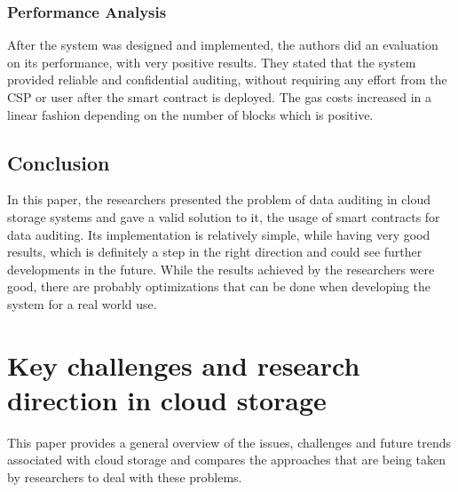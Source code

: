 \documentclass[14pt,oneside]{extreport}
\newcommand*\fpar{\hspace{1ex}}
\begin{document}
\subsection{Performance Analysis}
After the system was designed and implemented, the authors did an evaluation on its performance, with very positive results. They stated that the system provided reliable and confidential auditing, without requiring any effort from the CSP or user after the smart contract is deployed. The gas costs increased in a linear fashion depending on the number of blocks which is positive.
\section{Conclusion}
In this paper, the researchers presented the problem of data auditing in cloud storage systems and gave a valid solution to it, the usage of smart contracts for data auditing. Its implementation is relatively simple, while having very good results, which is definitely a step in the right direction and could see further developments in the future. While the results achieved by the researchers were good, there are probably optimizations that can be done when developing the system for a real world use.

\chapter{\Large{Key challenges and research direction in cloud storage \cite{paper5}}}
\vspace{-2em}
\fpar This paper provides a general overview of the issues, challenges and future trends associated with cloud storage and compares the approaches that are being taken by researchers to deal with these problems.
\end{document}
